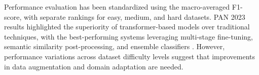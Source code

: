 Performance evaluation has been standardized using the macro-averaged F1-score, with separate rankings for easy, medium, and hard datasets. PAN 2023 results highlighted the superiority of transformer-based models over traditional techniques, with the best-performing systems leveraging multi-stage fine-tuning, semantic similarity post-processing, and ensemble classifiers \cite{paper2}. However, performance variations across dataset difficulty levels suggest that improvements in data augmentation and domain adaptation are needed.



